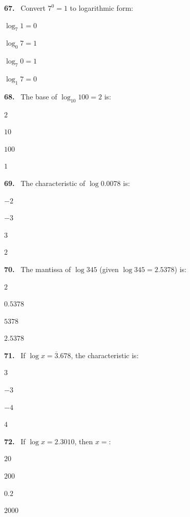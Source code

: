 \documentclass[11pt]{article}
\newenvironment{qenv}[1]{%
  \par\medskip\noindent\textbf{#1.}\ \ignorespaces
}{\par}
\begin{document}
\begin{qenv}{67} Convert $7^0=1$ to logarithmic form:
\begin{options} \item $\log_7 1=0$ \item $\log_0 7=1$ \item $\log_7 0=1$ \item $\log_1 7=0$ \end{options} \end{qenv}

\begin{qenv}{68} The base of $\log_{10}100=2$ is:
\begin{options} \item $2$ \item $10$ \item $100$ \item $1$ \end{options} \end{qenv}

\begin{qenv}{69} The characteristic of $\log 0.0078$ is:
\begin{options} \item $-2$ \item $-3$ \item $3$ \item $2$ \end{options} \end{qenv}

\begin{qenv}{70} The mantissa of $\log 345$ (given $\log 345=2.5378$) is:
\begin{options} \item $2$ \item $0.5378$ \item $5378$ \item $2.5378$ \end{options} \end{qenv}

\begin{qenv}{71} If $\log x = \overline{3}.678$, the characteristic is:
\begin{options} \item $3$ \item $-3$ \item $-4$ \item $4$ \end{options} \end{qenv}

\begin{qenv}{72} If $\log x = 2.3010$, then $x=$:
\begin{options} \item $20$ \item $200$ \item $0.2$ \item $2000$ \end{options} \end{qenv}
\end{document}
